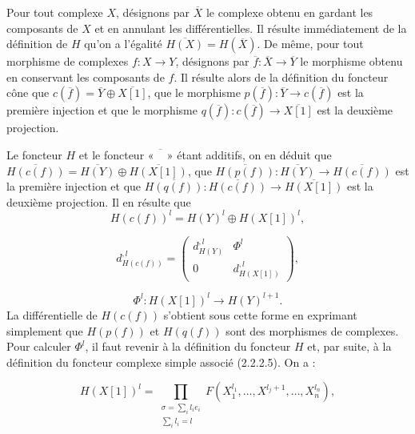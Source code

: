 \clearpage
{}%
\begingroup
\small
\setlength{\abovedisplayskip}{3pt plus 2pt minus 2pt}%
\setlength{\belowdisplayskip}{3pt plus 2pt minus 2pt}%
\setlength{\jot}{2pt}%

Pour tout complexe $X$, désignons par $\overline{X}$ le complexe obtenu en
gardant les composants de $X$ et en annulant les différentielles. Il résulte
immédiatement de la définition de $H$ qu'on a l'égalité
$\overline{H(X)}=H(\overline{X})$. De même, pour tout morphisme de complexes
$f\colon X\longrightarrow Y$, désignons par
$\overline{f}\colon\overline{X}\longrightarrow\overline{Y}$ le morphisme obtenu
en conservant les composants de $f$. Il résulte alors de la définition du
foncteur cône que $c(\overline{f})=\overline{Y}\oplus\overline{X[1]}$, que le
morphisme $p(\overline{f})\colon\overline{Y}\longrightarrow c(\overline{f})$
est la première injection et que le morphisme
$q(\overline{f})\colon c(\overline{f})\longrightarrow\overline{X[1]}$ est la
deuxième projection.

Le foncteur $H$ et le foncteur «\,$\overline{\phantom{X}}$\,» étant additifs,
on en déduit que
$\overline{H(c(f))}=\overline{H(Y)}\oplus\overline{H(X[1])}$, que
$\overline{H(p(f))}\colon\overline{H(Y)}\longrightarrow\overline{H(c(f))}$ est
la première injection et que
$\overline{H(q(f))}\colon\overline{H(c(f))}\longrightarrow\overline{H(X[1])}$
est la deuxième projection. Il en résulte que
\[
  H(c(f))^l=H(Y)^l\oplus H(X[1])^l,
\]

\begin{equation}
  d_{H(c(f))}^{,l}=
  \begin{pmatrix}
    d_{H(Y)}^{,l} & \Phi^l\\
    0 & d_{H(X[1])}^{,l}
  \end{pmatrix},
  \tag{3.4.3.2}
\end{equation}

\[
  \Phi^l\colon H(X[1])^l\longrightarrow H(Y)^{l+1}.
\]
La différentielle de $H(c(f))$ s'obtient sous cette forme en exprimant
simplement que $H(p(f))$ et $H(q(f))$ sont des morphismes de complexes. Pour
calculer $\Phi^l$, il faut revenir à la définition du foncteur $H$ et, par
suite, à la définition du foncteur complexe simple associé (2.2.2.5). On a :

\[
  H(X[1])^l=
  \prod_{\substack{\sigma=\sum_i l_i e_i\\ \sum_i l_i=l}}
  F(X_1^{l_1},\ldots,X^{l_j+1},\ldots,X_n^{l_n}),
\]

